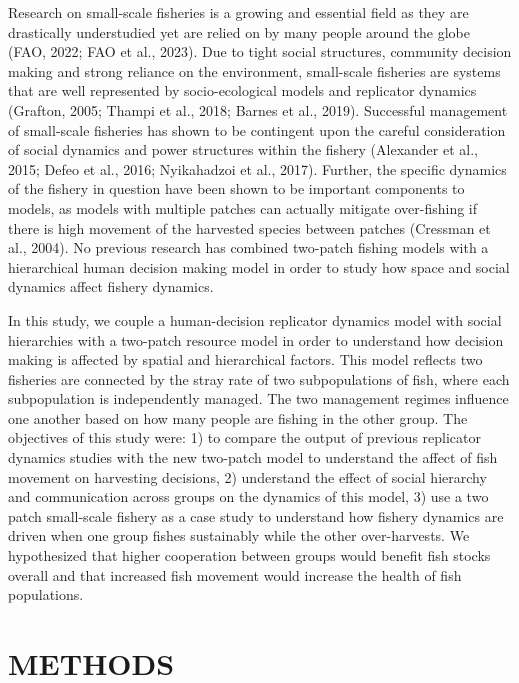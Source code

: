 \documentclass[
  12pt,
]{article}
\begin{document}
Research on small-scale fisheries is a growing and essential field as they are drastically understudied yet are relied on by many people around the globe (FAO, 2022; FAO et al., 2023). Due to tight social structures, community decision making and strong reliance on the environment, small-scale fisheries are systems that are well represented by socio-ecological models and replicator dynamics (Grafton, 2005; Thampi et al., 2018; Barnes et al., 2019). Successful management of small-scale fisheries has shown to be contingent upon the careful consideration of social dynamics and power structures within the fishery (Alexander et al., 2015; Defeo et al., 2016; Nyikahadzoi et al., 2017). Further, the specific dynamics of the fishery in question have been shown to be important components to models, as models with multiple patches can actually mitigate over-fishing if there is high movement of the harvested species between patches (Cressman et al., 2004). No previous research has combined two-patch fishing models with a hierarchical human decision making model in order to study how space and social dynamics affect fishery dynamics.

In this study, we couple a human-decision replicator dynamics model with social hierarchies with a two-patch resource model in order to understand how decision making is affected by spatial and hierarchical factors. This model reflects two fisheries are connected by the stray rate of two subpopulations of fish, where each subpopulation is independently managed. The two management regimes influence one another based on how many people are fishing in the other group. The objectives of this study were: 1) to compare the output of previous replicator dynamics studies with the new two-patch model to understand the affect of fish movement on harvesting decisions, 2) understand the effect of social hierarchy and communication across groups on the dynamics of this model, 3) use a two patch small-scale fishery as a case study to understand how fishery dynamics are driven when one group fishes sustainably while the other over-harvests. We hypothesized that higher cooperation between groups would benefit fish stocks overall and that increased fish movement would increase the health of fish populations.

\section{METHODS}\label{methods}
\end{document}
